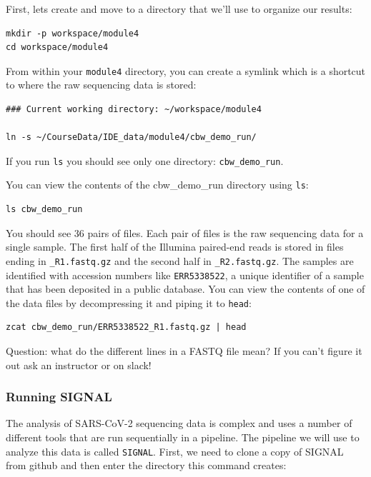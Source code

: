 \documentclass[
]{book}
\begin{document}
First, lets create and move to a directory that we'll use to organize our results:

\begin{verbatim}
mkdir -p workspace/module4
cd workspace/module4
\end{verbatim}

From within your \texttt{module4} directory, you can create a symlink which is a shortcut to where the raw sequencing data is stored:

\begin{verbatim}
### Current working directory: ~/workspace/module4

ln -s ~/CourseData/IDE_data/module4/cbw_demo_run/
\end{verbatim}

If you run \texttt{ls} you should see only one directory: \texttt{cbw\_demo\_run}.

You can view the contents of the cbw\_demo\_run directory using \texttt{ls}:

\begin{verbatim}
ls cbw_demo_run
\end{verbatim}

You should see 36 pairs of files. Each pair of files is the raw sequencing data for a single sample. The first half of the Illumina paired-end reads is stored in files ending in \texttt{\_R1.fastq.gz} and the second half in \texttt{\_R2.fastq.gz}. The samples are identified with accession numbers like \texttt{ERR5338522}, a unique identifier of a sample that has been deposited in a public database. You can view the contents of one of the data files by decompressing it and piping it to \texttt{head}:

\begin{verbatim}
zcat cbw_demo_run/ERR5338522_R1.fastq.gz | head
\end{verbatim}

Question: what do the different lines in a FASTQ file mean? If you can't figure it out ask an instructor or on slack!

\subsubsection{Running SIGNAL}\label{running-signal}

The analysis of SARS-CoV-2 sequencing data is complex and uses a number of different tools that are run sequentially in a pipeline. The pipeline we will use to analyze this data is called \texttt{SIGNAL}. First, we need to clone a copy of SIGNAL from github and then enter the directory this command creates:
\end{document}
